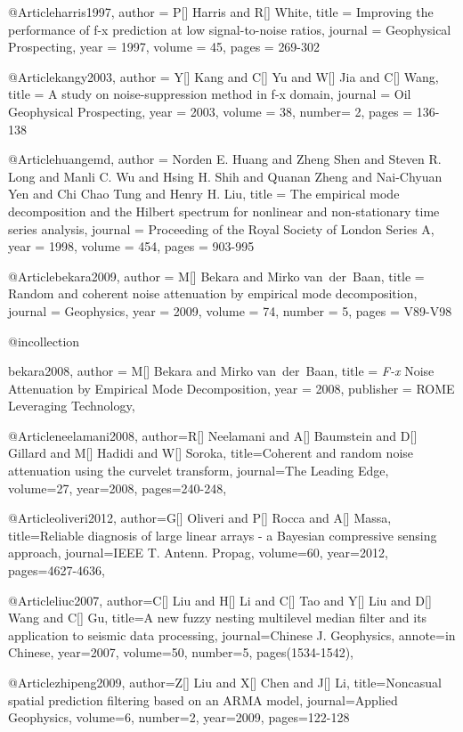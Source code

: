 @Article{harris1997,
  author = 	 {P[] Harris and R[] White},
  title = 	 {Improving the performance of f-x prediction at low signal-to-noise ratios},
  journal = 	 {Geophysical Prospecting},
  year = 	 1997,
  volume =	 45,
  pages =	 {269-302}
}


@Article{kangy2003,
  author = 	 {Y[] Kang and C[] Yu and W[] Jia and C[] Wang},
  title = 	 {A study on noise-suppression method in f-x domain},
  journal = 	 {Oil Geophysical Prospecting},
  year = 	 2003,
  volume =	 38,
  number=        2,
  pages =	 {136-138}
}

@Article{huangemd,
  author = 	 {Norden E. Huang and Zheng Shen and Steven R. Long and Manli C. Wu and Hsing H. Shih and Quanan Zheng and Nai-Chyuan Yen and Chi Chao Tung and Henry H. Liu},
  title = 	 {The empirical mode decomposition and the {Hilbert} spectrum for nonlinear and non-stationary time series analysis},
  journal = 	 {Proceeding of the Royal Society of London Series A},
  year = 	 1998,
  volume = 	 454,
  pages = 	 {903-995}}

@Article{bekara2009,
  author = 	 {M[] Bekara and Mirko van~der~Baan},
  title = 	 {Random and coherent noise attenuation by empirical mode decomposition},
  journal = 	 {Geophysics},
  year = 	 2009,
  volume = 	 74,
  number = 	 5,
  pages = 	 {V89-V98}}

@incollection{bekara2008,
author = {M[] Bekara and Mirko van~der~Baan},
title = { \emph{F-x} Noise Attenuation by Empirical Mode Decomposition},
year = {2008},
publisher = {ROME Leveraging Technology},

}

@Article{neelamani2008,
author={R[] Neelamani and A[] Baumstein and D[] Gillard and M[] Hadidi and W[] Soroka},
title={Coherent and random noise attenuation using the curvelet transform},
journal={The Leading Edge},
volume=27,
year=2008,
pages={240-248},
}

@Article{oliveri2012,
author={G[] Oliveri and P[] Rocca and A[] Massa},
title={Reliable diagnosis of large linear arrays - a Bayesian compressive sensing approach},
journal={IEEE T. Antenn. Propag},
volume=60,
year=2012,
pages={4627-4636},
}


@Article{liuc2007,
author={C[] Liu and H[] Li and C[] Tao and Y[] Liu and D[] Wang and C[] Gu},
title={A new fuzzy nesting multilevel median filter and its application to seismic data processing},
journal={Chinese J. Geophysics},
annote={in Chinese},
year=2007,
volume=50,
number=5,
pages(1534-1542),
}

@Article{zhipeng2009,
author={Z[] Liu and X[] Chen and J[] Li},
title={Noncasual spatial prediction filtering based on an ARMA model},
journal={Applied Geophysics},
volume=6,
number=2,
year=2009,
pages={122-128}
}

